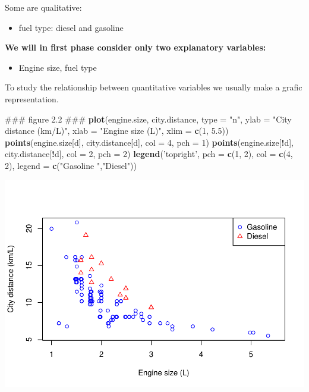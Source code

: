 \documentclass[]{article}
\newenvironment{Shaded}{\begin{snugshade}}{\end{snugshade}}
\newcommand{\KeywordTok}[1]{\textcolor[rgb]{0.13,0.29,0.53}{\textbf{#1}}}
\newcommand{\DataTypeTok}[1]{\textcolor[rgb]{0.13,0.29,0.53}{#1}}
\newcommand{\DecValTok}[1]{\textcolor[rgb]{0.00,0.00,0.81}{#1}}
\newcommand{\FloatTok}[1]{\textcolor[rgb]{0.00,0.00,0.81}{#1}}
\newcommand{\StringTok}[1]{\textcolor[rgb]{0.31,0.60,0.02}{#1}}
\newcommand{\OperatorTok}[1]{\textcolor[rgb]{0.81,0.36,0.00}{\textbf{#1}}}
\newcommand{\AlertTok}[1]{\textcolor[rgb]{0.94,0.16,0.16}{#1}}
\newcommand{\NormalTok}[1]{#1}
\providecommand{\tightlist}{%
  \setlength{\itemsep}{0pt}\setlength{\parskip}{0pt}}
\begin{document}
Some are qualitative:

\begin{itemize}
\tightlist
\item
  fuel type: diesel and gasoline
\end{itemize}

\textbf{We will in first phase consider only two explanatory variables:}

\begin{itemize}
\tightlist
\item
  Engine size, fuel type
\end{itemize}

To study the relationship between quantitative variables we usually make
a grafic representation.

\begin{Shaded}
\begin{Highlighting}[]
\NormalTok{### figure 2.2 }\AlertTok{###}
\KeywordTok{plot}\NormalTok{(engine.size, city.distance, }\DataTypeTok{type =} \StringTok{"n"}\NormalTok{, }\DataTypeTok{ylab =} \StringTok{"City distance (km/L)"}\NormalTok{,}
     \DataTypeTok{xlab =} \StringTok{"Engine size (L)"}\NormalTok{, }\DataTypeTok{xlim =} \KeywordTok{c}\NormalTok{(}\DecValTok{1}\NormalTok{, }\FloatTok{5.5}\NormalTok{))}
\KeywordTok{points}\NormalTok{(engine.size[d], city.distance[d], }\DataTypeTok{col =} \DecValTok{4}\NormalTok{, }\DataTypeTok{pch =} \DecValTok{1}\NormalTok{)}
\KeywordTok{points}\NormalTok{(engine.size[}\OperatorTok{!}\NormalTok{d], city.distance[}\OperatorTok{!}\NormalTok{d], }\DataTypeTok{col =} \DecValTok{2}\NormalTok{, }\DataTypeTok{pch =} \DecValTok{2}\NormalTok{)}
\KeywordTok{legend}\NormalTok{(}\StringTok{'topright'}\NormalTok{, }\DataTypeTok{pch =} \KeywordTok{c}\NormalTok{(}\DecValTok{1}\NormalTok{, }\DecValTok{2}\NormalTok{), }\DataTypeTok{col =} \KeywordTok{c}\NormalTok{(}\DecValTok{4}\NormalTok{, }\DecValTok{2}\NormalTok{),}
       \DataTypeTok{legend =} \KeywordTok{c}\NormalTok{(}\StringTok{"Gasoline  "}\NormalTok{,}\StringTok{"Diesel"}\NormalTok{))}
\end{Highlighting}
\end{Shaded}

\includegraphics{fromBook_files/figure-latex/unnamed-chunk-2-1.pdf}
\end{document}
